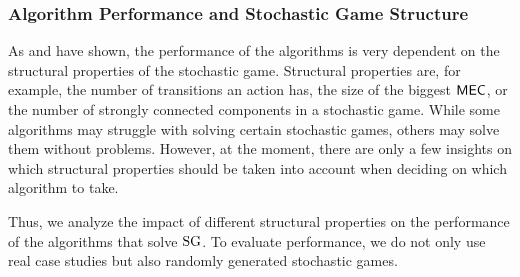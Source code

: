 \subsubsection*{Algorithm Performance and Stochastic Game Structure}
As \cite{haddadmonmege} and \cite{gandalf} have shown, the performance of the algorithms is very dependent on the structural properties of the stochastic game.
Structural properties are, for example, the number of transitions an action has, the size of the biggest $\mathsf{MEC}$, or the number of strongly connected components in a stochastic game.
While some algorithms may struggle with solving certain stochastic games, others may solve them without problems.
However, at the moment, there are only a few insights on which structural properties should be taken into account when deciding on which algorithm to take.

Thus, we analyze the impact of different structural properties on the performance of the algorithms that solve $\textrm{SG}$.
To evaluate performance, we do not only use real case studies but also randomly generated stochastic games.
